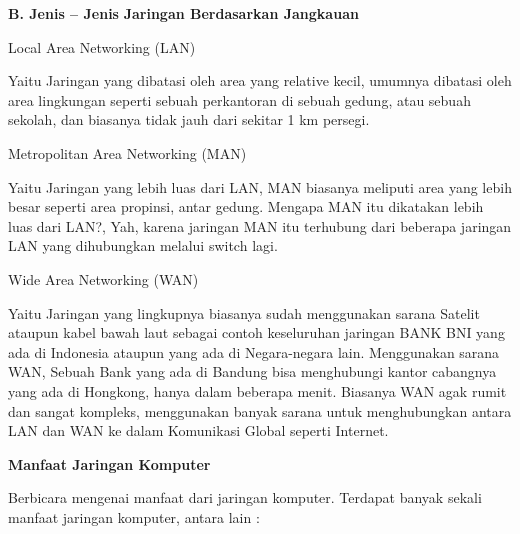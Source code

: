 \documentclass{wileySix}
\begin{document}
\vspace{12pt}
\noindent 
\textbf{B. Jenis – Jenis}\textbf{ Jaringan Berdasarkan Jangkauan} \par
\noindent 
\begin{myEnumerate}
	\item Local Area Networking (LAN) \par
	Yaitu Jaringan yang dibatasi oleh area yang relative kecil, umumnya dibatasi oleh area lingkungan seperti sebuah perkantoran di sebuah gedung, atau sebuah sekolah, dan biasanya tidak jauh dari sekitar 1 km persegi. \par
	\noindent 
	\item Metropolitan Area Networking (MAN) \par
	Yaitu Jaringan yang lebih luas dari LAN, MAN biasanya meliputi area yang lebih besar seperti area propinsi, antar gedung. Mengapa MAN itu dikatakan lebih luas dari LAN?, Yah, karena jaringan MAN itu terhubung dari beberapa jaringan LAN yang dihubungkan melalui switch lagi. \par
	\vspace{12pt}
	\noindent 
	\item Wide Area Networking (WAN)\end{myEnumerate}
\par
Yaitu Jaringan yang lingkupnya biasanya sudah menggunakan sarana Satelit ataupun kabel bawah laut sebagai contoh keseluruhan jaringan BANK BNI yang ada di Indonesia ataupun yang ada di Negara-negara lain. Menggunakan sarana WAN, Sebuah Bank yang ada di Bandung bisa menghubungi kantor cabangnya yang ada di Hongkong, hanya dalam beberapa menit. Biasanya WAN agak rumit dan sangat kompleks, menggunakan banyak sarana untuk menghubungkan antara LAN dan WAN ke dalam Komunikasi Global seperti Internet. \par
\vspace{12pt}
\noindent 
\textbf{Manfaat Jaringan Komputer} \par
Berbicara mengenai manfaat dari jaringan komputer. Terdapat banyak sekali manfaat jaringan komputer, antara lain : \par
\noindent 
\end{document}
